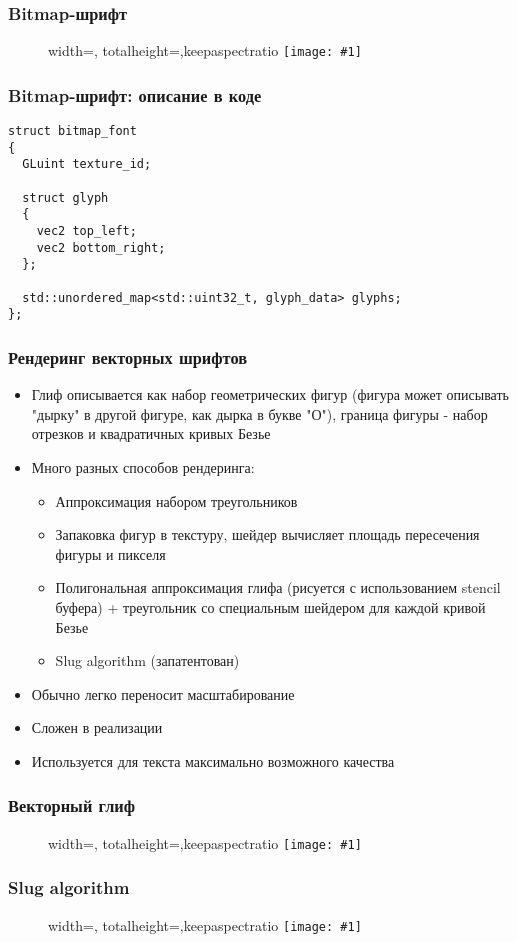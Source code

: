 \documentclass{beamer}
\newcommand{\slideimage}[1]{
  \begin{figure}
    \begin{adjustbox}{width=\textwidth, totalheight=\textheight-2\baselineskip-2\baselineskip,keepaspectratio}
      \texttt{[image: \#1]}
    \end{adjustbox}
  \end{figure}
}
\begin{document}
\begin{frame}[fragile]
\frametitle{Bitmap-шрифт}
\slideimage{bitmap-font.png}
\end{frame}

\begin{frame}[fragile]
\frametitle{Bitmap-шрифт: описание в коде}
\begin{verbatim}
struct bitmap_font
{
  GLuint texture_id;

  struct glyph
  {
    vec2 top_left;
    vec2 bottom_right;
  };

  std::unordered_map<std::uint32_t, glyph_data> glyphs;
};
\end{verbatim}
\end{frame}

\begin{frame}[fragile]
\frametitle{Рендеринг векторных шрифтов}
\begin{itemize}
\item Глиф описывается как набор геометрических фигур (фигура может описывать "дырку" в другой фигуре, как дырка в букве "О"), граница фигуры - набор отрезков и квадратичных кривых Безье
\pause
\item Много разных способов рендеринга:
\pause
\begin{itemize}
\item Аппроксимация набором треугольников
\pause
\item Запаковка фигур в текстуру, шейдер вычисляет площадь пересечения фигуры и пикселя
\pause
\item Полигональная аппроксимация глифа (рисуется с использованием stencil буфера) + треугольник со специальным шейдером для каждой кривой Безье
\pause
\item Slug algorithm (запатентован)
\end{itemize}
\pause
\item Обычно легко переносит масштабирование
\pause
\item Сложен в реализации
\pause
\item Используется для текста максимально возможного качества
\end{itemize}
\end{frame}

\begin{frame}[fragile]
\frametitle{Векторный глиф}
\slideimage{vector-glyph.png}
\end{frame}

\begin{frame}[fragile]
\frametitle{Slug algorithm}
\slideimage{slug.jpg}
\end{frame}
\end{document}
